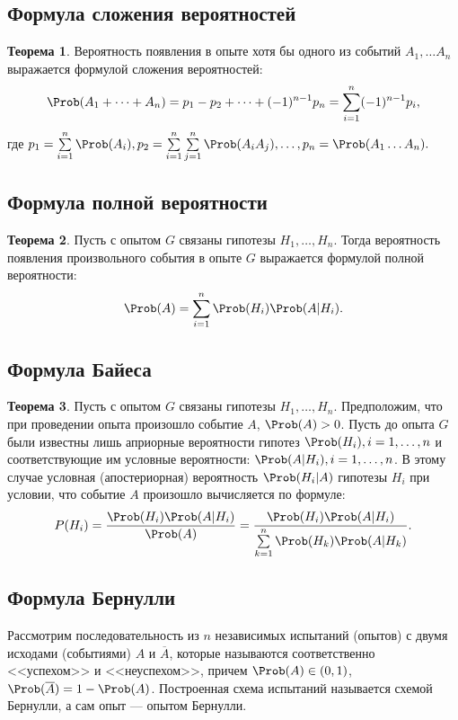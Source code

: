 \documentclass[12pt]{report}
\theoremstyle{definition}
\newtheorem{theorem}{Теорема}[chapter]
\begin{document}
\subsection{Формула сложения вероятностей}
\begin{theorem}
Вероятность появления в опыте хотя бы одного из событий $A_1, \dots A_n$
выражается формулой сложения вероятностей:
$$
\Prob(A_1 + \dots + A_n) = p_1 - p_2 + \dots + (-1)^{n-1} p_n
= \sum\limits_{i=1}^n (-1)^{n-1} p_i,
$$
где 
$p_1 = \sum\limits_{i=1}^n \Prob(A_i),
p_2 = \sum\limits_{i=1}^n\sum\limits_{j=1}^n \Prob(A_i A_j),
\dots,
p_n = \Prob(A_1 \dots A_n).
$
\end{theorem}

\subsection{Формула полной вероятности}
\begin{theorem}
Пусть с опытом $G$ связаны гипотезы $H_1, \dots, H_n$.
Тогда вероятность появления произвольного события в опыте $G$
выражается формулой полной вероятности:
$$
\Prob(A) = \sum\limits_{i=1}^n \Prob(H_i) \Prob(A|H_i).
$$
\end{theorem}

\subsection{Формула Байеса}
\begin{theorem}
Пусть с опытом $G$ связаны гипотезы $H_1, \dots, H_n$. Предположим,
что при проведении опыта произошло событие $A$, $\Prob(A) > 0$. Пусть 
до опыта $G$ были известны лишь априорные вероятности гипотез
$\Prob(H_i), i =1, \dots, n$ и соответствующие им условные вероятности:
$\Prob(A|H_i), i =1, \dots, n$. В этому случае условная (апостериорная)
вероятность $\Prob(H_i|A)$ гипотезы $H_i$ при условии, что событие $A$ произошло
вычисляется по формуле:
$$
P(H_i) = \dfrac{\Prob(H_i) \Prob(A|H_i)}{\Prob(A)}
= \dfrac{\Prob(H_i) \Prob(A|H_i)}{\sum\limits_{k=1}^n \Prob(H_k) \Prob(A|H_k)}.
$$
\end{theorem}


\subsection{Формула Бернулли}
Рассмотрим последовательность из $n$ независимых испытаний
(опытов) с двумя исходами (событиями) $A$ и $\overline{A}$, которые
называются соответственно <<успехом>> и <<неуспехом>>,
причем $\Prob(A) \in (0, 1)$, $\Prob(\overline{A}) = 1 - \Prob(A)$.
Построенная схема испытаний называется схемой Бернулли,
а сам опыт --- опытом Бернулли. 
\end{document}
